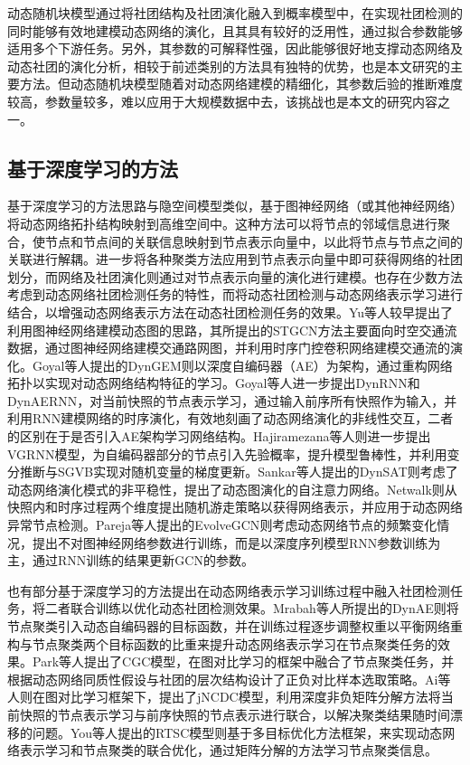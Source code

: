 动态随机块模型通过将社团结构及社团演化融入到概率模型中，在实现社团检测的同时能够有效地建模动态网络的演化，且其具有较好的泛用性，通过拟合参数能够适用多个下游任务。另外，其参数的可解释性强，因此能够很好地支撑动态网络及动态社团的演化分析，相较于前述类别的方法具有独特的优势，也是本文研究的主要方法。但动态随机块模型随着对动态网络建模的精细化，其参数后验的推断难度较高，参数量较多，难以应用于大规模数据中去，该挑战也是本文的研究内容之一。



\subsection{基于深度学习的方法}

基于深度学习的方法思路与隐空间模型类似，基于图神经网络（或其他神经网络）将动态网络拓扑结构映射到高维空间中。这种方法可以将节点的邻域信息进行聚合，使节点和节点间的关联信息映射到节点表示向量中，以此将节点与节点之间的关联进行解耦。进一步将各种聚类方法应用到节点表示向量中即可获得网络的社团划分，而网络及社团演化则通过对节点表示向量的演化进行建模。也存在少数方法考虑到动态网络社团检测任务的特性，而将动态社团检测与动态网络表示学习进行结合，以增强动态网络表示方法在动态社团检测任务的效果。Yu等人较早提出了利用图神经网络建模动态图的思路，其所提出的STGCN\cite{yu2017spatio}方法主要面向时空交通流数据，通过图神经网络建模交通路网图，并利用时序门控卷积网络建模交通流的演化。Goyal等人提出的DynGEM\cite{goyal2018dyngem}则以深度自编码器（AE）为架构，通过重构网络拓扑以实现对动态网络结构特征的学习。Goyal等人进一步提出DynRNN和DynAERNN\cite{goyal2020dyngraph2vec}，对当前快照的节点表示学习，通过输入前序所有快照作为输入，并利用RNN建模网络的时序演化，有效地刻画了动态网络演化的非线性交互，二者的区别在于是否引入AE架构学习网络结构。Hajiramezana等人\cite{hajiramezanali2019variational}则进一步提出VGRNN模型，为自编码器部分的节点引入先验概率，提升模型鲁棒性，并利用变分推断与SGVB实现对随机变量的梯度更新。Sankar等人提出的DynSAT\cite{sankar2018dynamic}则考虑了动态网络演化模式的非平稳性，提出了动态图演化的自注意力网络。Netwalk\cite{yu2018netwalk}则从快照内和时序过程两个维度提出随机游走策略以获得网络表示，并应用于动态网络异常节点检测。Pareja等人提出的EvolveGCN\cite{pareja2020evolvegcn}则考虑动态网络节点的频繁变化情况，提出不对图神经网络参数进行训练，而是以深度序列模型RNN参数训练为主，通过RNN训练的结果更新GCN的参数。

也有部分基于深度学习的方法提出在动态网络表示学习训练过程中融入社团检测任务，将二者联合训练以优化动态社团检测效果。Mrabah等人所提出的DynAE\cite{mrabah2019deep}则将节点聚类引入动态自编码器的目标函数，并在训练过程逐步调整权重以平衡网络重构与节点聚类两个目标函数的比重来提升动态网络表示学习在节点聚类任务的效果。Park等人\cite{park2022cgc}提出了CGC模型，在图对比学习的框架中融合了节点聚类任务，并根据动态网络同质性假设与社团的层次结构设计了正负对比样本选取策略。Ai等人\cite{10502242}则在图对比学习框架下，提出了jNCDC模型，利用深度非负矩阵分解方法将当前快照的节点表示学习与前序快照的节点表示进行联合，以解决聚类结果随时间漂移的问题。You等人\cite{you2021robust}提出的RTSC模型则基于多目标优化方法框架，来实现动态网络表示学习和节点聚类的联合优化，通过矩阵分解的方法学习节点聚类信息。

